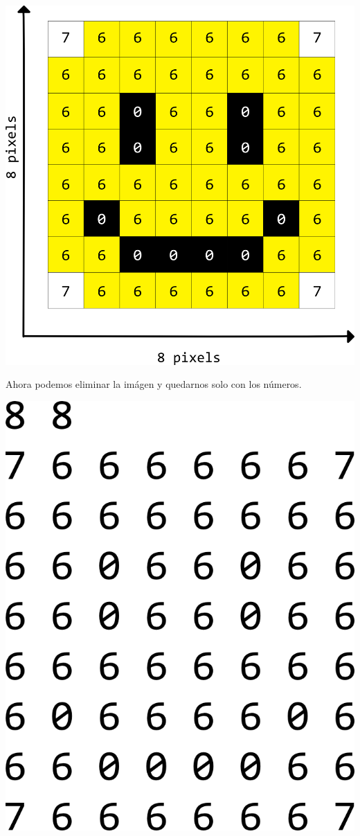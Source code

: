 \centerline{\includegraphics[scale=0.5]{soluciones/2_informacion/1_bajo_nivel/imagenes/pixels_smile_labeled.png}}

Ahora podemos eliminar la imágen y quedarnos solo con los números.

\centerline{\includegraphics[scale=0.5]{soluciones/2_informacion/1_bajo_nivel/imagenes/pixels_smile_numbers.png}}

